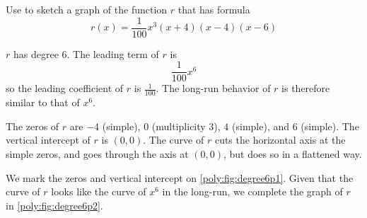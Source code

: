 \begin{pccexample}
Use  to sketch a graph of the function $r$ 
that has formula
\[
    r(x)=\frac{1}{100}x^3(x+4)(x-4)(x-6)
\]
\begin{pccsolution}
    \begin{steps}
        \item $r$ has degree $6$. The leading term of $r$ is 
         \[
         \frac{1}{100}x^6
         \]
         so the leading coefficient of $r$ is $\frac{1}{100}$. The long-run behavior of $r$
         is therefore similar to that of $x^6$.
        \item The zeros of $r$ are $-4$ (simple), $0$ (multiplicity $3$), $4$ (simple), 
         and $6$ (simple). The vertical intercept of $r$ is $(0,0)$. The curve of $r$
         cuts the horizontal axis at the simple zeros, and goes through the axis
         at $(0,0)$, but does so in a flattened way.
        \item We mark the zeros and vertical intercept on \cref{poly:fig:degree6p1}. Given that
       the curve of $r$ looks like the curve of $x^6$ in the long-run, we complete the graph
       of $r$ in \cref{poly:fig:degree6p2}.
    \end{steps}


\end{pccsolution}
\end{pccexample}
